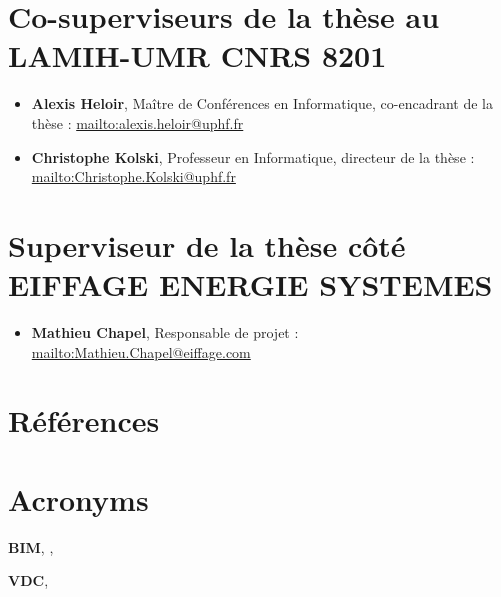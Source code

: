 \documentclass[a4paper,12pt]{article}
\begin{document}
\section{Co-superviseurs de la thèse au LAMIH-UMR CNRS 8201}
\label{sec:orgddba83a}
\begin{itemize}
\item \textbf{Alexis Heloir}, Maître de Conférences en Informatique, co-encadrant de la thèse : \url{mailto:alexis.heloir@uphf.fr}
\item \textbf{Christophe Kolski}, Professeur en Informatique, directeur de la thèse : \url{mailto:Christophe.Kolski@uphf.fr}
\end{itemize}
\section{Superviseur de la thèse côté EIFFAGE ENERGIE SYSTEMES}
\label{sec:org949a322}
\begin{itemize}
\item \textbf{Mathieu Chapel}, Responsable de projet : \url{mailto:Mathieu.Chapel@eiffage.com}
\end{itemize}
\section{Références}
\label{sec:orge56c117}
\begin{multicols}{2}
\small{
\printbibliography[heading=none]
}\clearpage\end{multicols}
\section{Acronyms}
\label{sec:org060c1dd}
\textbf{\hypertarget{gls-69}{BIM}}\hspace*{1em}\hspace*{.5em}\pageref{gls-1-use-1}, \pageref{gls-1-use-2}, \pageref{gls-1-use-3}

\textbf{\hypertarget{gls-341}{VDC}}\hspace*{1em}\hspace*{.5em}\pageref{gls-2-use-1}, \pageref{gls-2-use-2}
\end{document}

